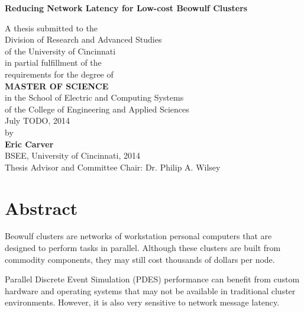 \documentclass[11pt]{book}
\begin{document}
\thispagestyle{empty}

\doublespacing

\vspace*{0.5in}

\begin{center}
  \LARGE{\textbf{Reducing Network Latency for Low-cost Beowulf Clusters}}

  \vspace*{0.4in}

  {\large A thesis submitted to the\\[0.20in]
    Division of Research and Advanced Studies\\
    of the University of Cincinnati\\[0.20in]
    in partial fulfillment of the\\
    requirements for the degree of\\[0.20in]
    {\bf MASTER OF SCIENCE}\\[0.20in]
    in the School of Electric and Computing Systems\\
    of the College of Engineering and Applied
    Sciences\\[0.20in]
    July TODO, 2014\\[0.20in]
    by\\[0.20in]
    {\bf Eric Carver}\\
    BSEE, University of
    Cincinnati, 2014\\}
  \vspace{0.5in}
  {\large Thesis Advisor and Committee Chair:  Dr. Philip A. Wilsey}
\end{center}

\clearpage

\setcounter{page}{1}
\clearpage

\chapter*{Abstract}

Beowulf clusters are networks of workstation personal computers that are
designed to perform tasks in parallel. Although these clusters are built from
commodity components, they may still cost thousands of dollars per node.

Parallel Discrete Event Simulation (PDES) performance can benefit from custom
hardware and operating systems that may not be available in traditional cluster
environments. However, it is also very sensitive to network message latency.
\end{document}

